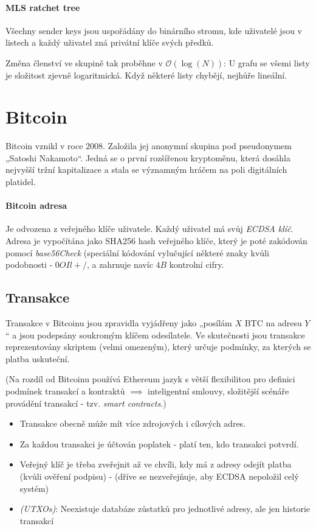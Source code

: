 \documentclass[10pt,a4paper]{article}
\begin{document}
\paragraph{MLS ratchet tree}
Všechny sender keys jsou uspořádány do binárního stromu, kde uživatelé jsou v listech a každý uživatel zná privátní klíče svých předků.

Změna členství ve skupině tak proběhne v $\mathcal O(\log(N))$:
U grafu se všemi listy je složitost zjevně logaritmická. 
Když některé listy chybějí, nejhůře lineální.

\section{Bitcoin}
Bitcoin vznikl v roce $ 2008 $. Založila jej anonymní skupina pod pseudonymem „Satoshi Nakamoto“. Jedná se o první rozšířenou kryptoměnu, která dosáhla nejvyšší tržní kapitalizace a stala se významným hráčem na poli digitálních platidel.

\paragraph{Bitcoin adresa}
Je odvozena z veřejného klíče uživatele. 
Každý uživatel má svůj \textit{ECDSA klíč}.
Adresa je vypočítána jako SHA256 hash veřejného klíče, který je poté zakódován pomocí \textit{base56Check} (speciální kódování vylučující některé znaky kvůli podobnosti - $0OIl+/$, a zahrnuje navíc $4B$ kontrolní cifry.

\subsection{Transakce}
Transakce v Bitcoinu jsou zpravidla vyjádřeny jako „posílám $ X $ BTC na adresu $ Y $“ a jsou podepsány soukromým klíčem odesílatele. 
Ve skutečnosti jsou transakce reprezentovány skriptem (velmi omezeným), který určuje podmínky, za kterých se platba uskuteční. 

(Na rozdíl od Bitcoinu používá Ethereum  jazyk s větší flexibilitou pro definici podmínek transakcí a kontraktů $ \implies $ inteligentní smlouvy, složitější scénáře provádění transakcí - tzv. \textit{smart contracts}.)

\begin{itemize}\setlength\itemsep{0em}
	\item Transakce obecně může mít více zdrojových i cílových adres.
	\item Za každou transakci je účtován poplatek - platí ten, kdo transakci potvrdí.
	\item Veřejný klíč je třeba zveřejnit až ve chvíli, kdy má z adresy odejít platba (kvůli ověření podpisu) - (dříve se nezveřejňuje, aby ECDSA nepoložil celý systém)
	\item \textit{(UTXOs)}: Neexistuje databáze zůstatků pro jednotlivé adresy, ale jen historie transakcí
\end{itemize}
\end{document}
